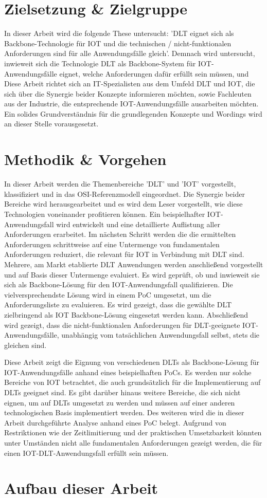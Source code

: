 %
%
\section{Zielsetzung \& Zielgruppe}
\label{sec:intro:goal}
In dieser Arbeit wird die folgende These untersucht: 'DLT eignet sich als Backbone-Technologie für IOT und die technischen / nicht-funktionalen Anforderungen sind für alle Anwendungsfälle gleich'. Demnach wird untersucht, inwieweit sich die Technologie \ac{DLT} als Backbone-System für \ac{IOT}-Anwendungsfälle eignet, welche Anforderungen dafür erfüllt sein müssen, und  Diese Arbeit richtet sich an IT-Spezialisten aus dem Umfeld \ac{DLT} und \ac{IOT}, die sich über die Synergie beider Konzepte informieren möchten, sowie Fachleuten aus der Industrie, die entsprechende \ac{IOT}-Anwendungsfälle ausarbeiten möchten. Ein solides Grundverständnis für die grundlegenden Konzepte und Wordings wird an dieser Stelle vorausgesetzt.

%
%
\section{Methodik \& Vorgehen}
\label{sec:intro:methodology}
\lipsum[1-1]

In dieser Arbeit werden die Themenbereiche 'DLT' und 'IOT' vorgestellt, klassifiziert und in das OSI-Referenzmodell eingeordnet. Die Synergie beider Bereiche wird herausgearbeitet und es wird dem Leser vorgestellt, wie diese Technologien voneinander profitieren können. Ein beispielhafter IOT-Anwendungsfall wird entwickelt und eine detaillierte Auflistung aller Anforderungen erarbeitet. Im nächsten Schritt werden die die ermittelten Anforderungen schrittweise auf eine Untermenge von fundamentalen Anforderungen reduziert, die relevant für IOT in Verbindung mit DLT sind. Mehrere, am Markt etablierte DLT Anwendungen werden anschließend vorgestellt und auf Basis dieser Untermenge evaluiert. Es wird geprüft, ob und inwieweit sie sich als Backbone-Lösung für den IOT-Anwendungsfall qualifizieren. Die vielversprechendste Lösung wird in einem PoC umgesetzt, um die Anforderungsliste zu evaluieren. Es wird gezeigt, dass die gewählte DLT zielbringend als IOT Backbone-Lösung eingesetzt werden kann. Abschließend wird gezeigt, dass die nicht-funktionalen Anforderungen für DLT-geeignete IOT-Anwendungsfälle, unabhängig vom tatsächlichen Anwendungsfall selbst, stets die gleichen sind.

Diese Arbeit zeigt die Eignung von verschiedenen DLTs als Backbone-Lösung für IOT-Anwendungsfälle anhand eines beispielhaften PoCs. Es werden nur solche Bereiche von IOT betrachtet, die auch grundsätzlich für die Implementierung auf DLTs geeignet sind. Es gibt darüber hinaus weitere Bereiche, die sich nicht eignen, um auf DLTs umgesetzt zu werden und müssen auf einer anderen technologischen Basis implementiert werden. Des weiteren wird die in dieser Arbeit durchgeführte Analyse anhand eines PoC belegt. Aufgrund von Restriktionen wie der Zeitlimitierung und der praktischen Umsetzbarkeit könnten unter Umständen nicht alle fundamentalen Anforderungen gezeigt werden, die für einen IOT-DLT-Anwendungsfall erfüllt sein müssen.


%
%
\section{Aufbau dieser Arbeit}
\label{sec:intro:structure}
\lipsum[1-1]
